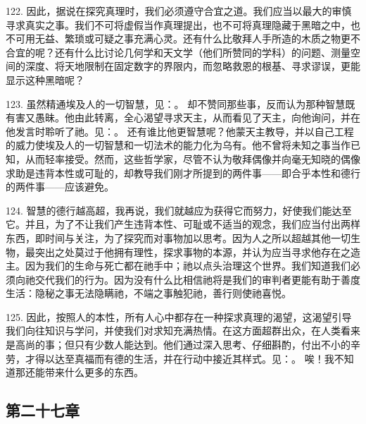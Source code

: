 \par

122. 因此，据说在探究真理时，我们必须遵守合宜之道。我们应当以最大的审慎寻求真实之事。我们不可将虚假当作真理提出，也不可将真理隐藏于黑暗之中，也不可用无益、繁琐或可疑之事充满心灵。还有什么比敬拜人手所造的木质之物更不合宜的呢？还有什么比讨论几何学和天文学（他们所赞同的学科）的问题、测量空间的深度、将天地限制在固定数字的界限内，而忽略救恩的根基、寻求谬误，更能显示这种黑暗呢？\par

123. 虽然精通埃及人的一切智慧，见：。 却不赞同那些事，反而认为那种智慧既有害又愚昧。他由此转离，全心渴望寻求天主，从而看见了天主，向他询问，并在他发言时聆听了祂。见：。 还有谁比他更智慧呢？他蒙天主教导，并以自己工程的威力使埃及人的一切智慧和一切法术的能力化为乌有。他不曾将未知之事当作已知，从而轻率接受。然而，这些哲学家，尽管不认为敬拜偶像并向毫无知晓的偶像求助是违背本性或可耻的，却教导我们刚才所提到的两件事——即合乎本性和德行的两件事——应该避免。\par

124. 智慧的德行越高超，我再说，我们就越应为获得它而努力，好使我们能达至它。并且，为了不让我们产生违背本性、可耻或不适当的观念，我们应当付出两样东西，即时间与关注，为了探究而对事物加以思考。因为人之所以超越其他一切生物，最突出之处莫过于他拥有理性，探求事物的本源，并认为应当寻求他存在之造主。因为我们的生命与死亡都在祂手中；祂以点头治理这个世界。我们知道我们必须向祂交代我们的行为。因为没有什么比相信祂将是我们的审判者更能有助于善度生活：隐秘之事无法隐瞒祂，不端之事触犯祂，善行则使祂喜悦。\par

125. 因此，按照人的本性，所有人心中都存在一种探求真理的渴望，这渴望引导我们向往知识与学问，并使我们对求知充满热情。在这方面超群出众，在人类看来是高尚的事；但只有少数人能达到。他们通过深入思考、仔细斟酌，付出不小的辛劳，才得以达至真福而有德的生活，并在行动中接近其样式。见：。 唉！我不知道那还能带来什么更多的东西。\par


\subsection{第二十七章}

